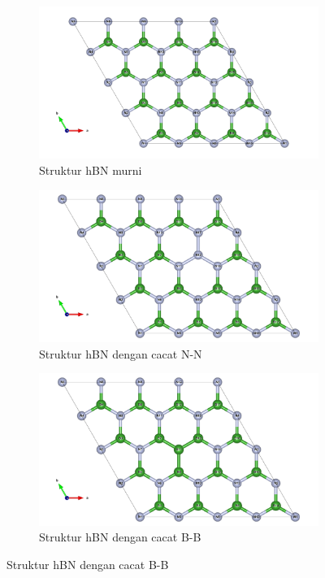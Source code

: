 \begin{figure}[htbp]
    \centering

    \begin{subfigure}{0.8\linewidth}
        \centering
        \includegraphics[width=\linewidth]{gambar_hasil/pure_hBN_4x4x1.png}
        \caption{Struktur hBN murni}
    \end{subfigure}
    \vspace{0.5cm} %

    \begin{subfigure}{0.8\linewidth}
        \centering
        \includegraphics[width=\linewidth]{gambar_hasil/NN_defect_hBN_center_4x4x1.png}
        \caption{Struktur hBN dengan cacat N-N}
    \end{subfigure}
    \vspace{0.5cm}

    \begin{subfigure}{0.8\linewidth}
        \centering
  
      \includegraphics[width=\linewidth]{gambar_hasil/BB_defect_hBN_center_4x4x1.png}
        \caption{Struktur hBN dengan cacat B-B}
    \end{subfigure}


\end{figure}
